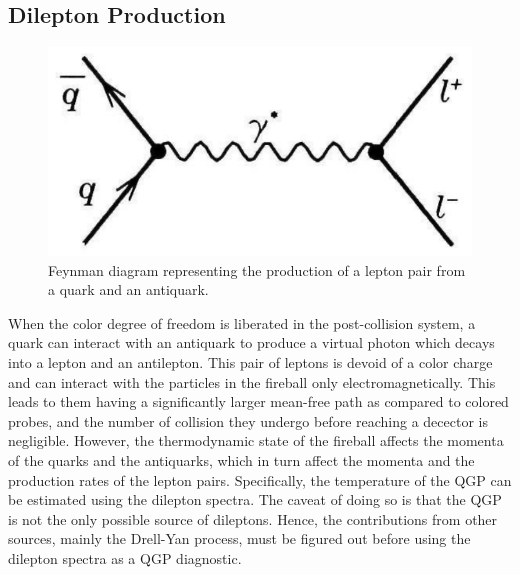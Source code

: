 \subsection{Dilepton Production}
\begin{figure}[h]
  \centering
  \includegraphics[width=4.5in]{figures/dilepton.PNG}
  \caption{Feynman diagram representing the production of a lepton pair from a quark and an antiquark. \cite{wong1994introduction}}\label{fig:dilepton}
\end{figure}
When the color degree of freedom is liberated in the post-collision system, a quark can interact with an antiquark to produce a virtual photon which decays into a lepton and an antilepton. This pair of leptons is devoid of a color charge and can interact with the particles in the fireball only electromagnetically. This leads to them having a significantly larger mean-free path as compared to colored probes, and the number of collision they undergo before reaching a decector is negligible. However, the thermodynamic state of the fireball affects the momenta of the quarks and the antiquarks, which in turn affect the momenta and the production rates of the lepton pairs. Specifically, the temperature of the QGP can be estimated using the dilepton spectra. The caveat of doing so is that the QGP is not the only possible source of dileptons. Hence, the contributions from other sources, mainly the Drell-Yan process, must be figured out before using the dilepton spectra as a QGP diagnostic. \cite{wong1994introduction}


